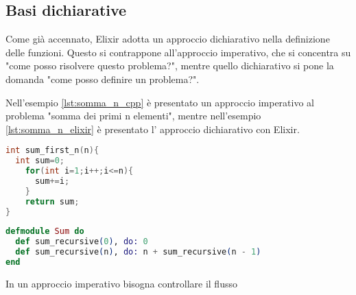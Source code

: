 
\subsection{Basi dichiarative}

Come già accennato, Elixir adotta un approccio
dichiarativo nella definizione delle funzioni.
Questo si contrappone all'approccio imperativo,
che si concentra su "come posso risolvere questo problema?",
mentre quello dichiarativo si pone la domanda 
"come posso definire un problema?".

Nell'esempio \ref{lst:somma_n_cpp} è presentato un approccio
imperativo al problema "somma dei primi n elementi", mentre
nell'esempio \ref{lst:somma_n_elixir} è presentato l' approccio dichiarativo
con Elixir.

\renewcommand\lstlistingname{Esempio}

\begin{lstlisting}[language=cpp, caption={Somma N elementi},captionpos=b,
	label={lst:somma_n_cpp}]
int sum_first_n(n){
  int sum=0;
    for(int i=1;i++;i<=n){
      sum+=i;
    }
    return sum;
}
\end{lstlisting}

\begin{lstlisting}[language=elixir, caption={Somma N elementi},captionpos=b,
	label={lst:somma_n_elixir}]
defmodule Sum do
  def sum_recursive(0), do: 0
  def sum_recursive(n), do: n + sum_recursive(n - 1)
end
\end{lstlisting}

In un approccio imperativo bisogna controllare il flusso








